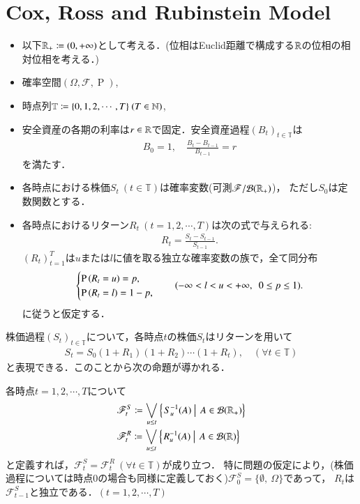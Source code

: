 \section{Cox, Ross and Rubinstein Model}
\begin{asm}[問題の仮定]\mbox{}
\begin{itemize}
	\item 以下$\mathbb{R}_+ \coloneqq (0, +\infty)$として考える．(位相はEuclid距離で構成する$\mathbb{R}$の位相の相対位相を考える．) 
	\item 確率空間$(\Omega, \mathscr{F}, \operatorname{P})$,
	\item 時点列$\mathbb{T} \coloneqq \{0, 1, 2, \cdots, T\} \ (T \in \mathbb{N})$,
	\item 安全資産の各期の利率は$r \in \mathbb{R}$で固定．安全資産過程$(B_t)_{t \in \mathbb{T}}$は
		\begin{align}
			B_0 = 1, \quad \frac{B_t - B_{t-1}}{B_{t-1}} = r
		\end{align}
		を満たす．
	\item 各時点における株価$S_t\ (t \in \mathbb{T})$は確率変数(可測$\mathscr{F}/\mathcal{B}(\mathbb{R}_+)$)，
		ただし$S_0$は定数関数とする．
	\item 各時点におけるリターン$R_t\ (t = 1,2,\cdots,T)$は次の式で与えられる:
		\begin{align}
			R_t = \frac{S_t - S_{t-1}}{S_{t-1}}.
		\end{align}
		$(R_t)_{t=1}^{T}$は$u$または$l$に値を取る独立な確率変数の族で，全て同分布
		\begin{align}
			\begin{cases}
				\operatorname{P} \left(R_t = u\right) = p, \\
				\operatorname{P} \left(R_t = l\right) = 1-p,
			\end{cases}
			\quad(-\infty < l < u < +\infty,\ \ 0 \leq p \leq 1).
		\end{align}
		に従うと仮定する．
\end{itemize}
\end{asm}

株価過程$(S_t)_{t \in \mathbb{T}}$について，各時点$t$の株価$S_t$はリターンを用いて
\begin{align}
	S_t = S_0 (1 + R_1)(1 + R_2)\cdots(1 + R_t), \quad (\forall t \in \mathbb{T})
\end{align}
と表現できる．このことから次の命題が導かれる．

\begin{prp}
	各時点$t = 1,2,\cdots,T$について
	\begin{align}
		&\mathscr{F}_t^S \coloneqq \bigvee_{u \leq t}\left\{\left.S_u^{-1}(A)\ \right|\ A \in \mathcal{B}(\mathbb{R}_+)\right\} \\
		&\mathscr{F}_t^R \coloneqq \bigvee_{u \leq t}\left\{\left.R_u^{-1}(A)\ \right|\ A \in \mathcal{B}(\mathbb{R})\right\} 
	\end{align}
	と定義すれば，$\mathscr{F}_t^S = \mathscr{F}_t^R\ (\forall t \in \mathbb{T})$が成り立つ．
	特に問題の仮定により，(株価過程については時点0の場合も同様に定義しておく)$\mathscr{F}_0^S = \{\emptyset,\ \Omega\}$であって，
	$R_t$は$\mathscr{F}_{t-1}^S$と独立である．$(t = 1,2,\cdots,T)$
\end{prp}

